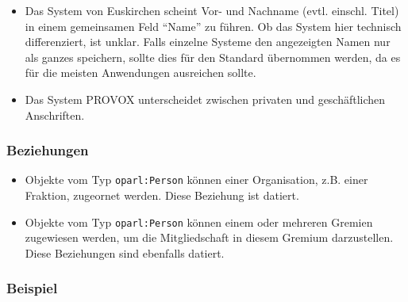 \documentclass[,a4paper]{article}
\begin{document}
\begin{itemize}
\itemsep1pt\parskip0pt
\item
  Das System von Euskirchen scheint Vor- und Nachname (evtl. einschl.
  Titel) in einem gemeinsamen Feld ``Name'' zu führen. Ob das System
  hier technisch differenziert, ist unklar. Falls einzelne Systeme den
  angezeigten Namen nur als ganzes speichern, sollte dies für den
  Standard übernommen werden, da es für die meisten Anwendungen
  ausreichen sollte.
\item
  Das System PROVOX unterscheidet zwischen privaten und geschäftlichen
  Anschriften.
\end{itemize}

\subsubsection{Beziehungen}\label{beziehungen-1}

\begin{itemize}
\itemsep1pt\parskip0pt
\item
  Objekte vom Typ \texttt{oparl:Person} können einer Organisation, z.B.
  einer Fraktion, zugeornet werden. Diese Beziehung ist datiert.
\item
  Objekte vom Typ \texttt{oparl:Person} können einem oder mehreren
  Gremien zugewiesen werden, um die Mitgliedschaft in diesem Gremium
  darzustellen. Diese Beziehungen sind ebenfalls datiert.
\end{itemize}

\subsubsection{Beispiel}\label{beispiel-2}
\end{document}
